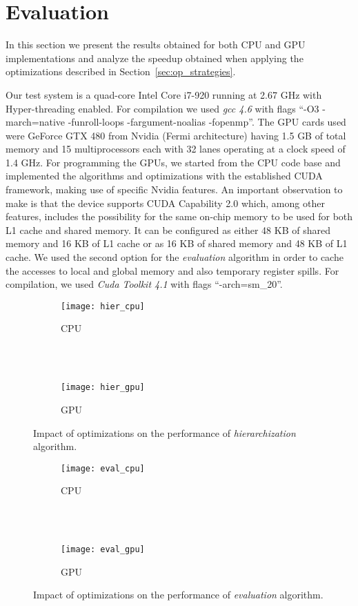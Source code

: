 \section{Evaluation}
\label{sec:evaluation}

In this section we present the results obtained for both CPU and GPU
implementations and analyze the speedup obtained when applying the
optimizations described in Section~\ref{sec:op_strategies}.

Our test system is a quad-core Intel Core i7-920 running at 2.67 GHz with
Hyper-threading enabled. For compilation we used \textit{gcc 4.6} with flags
``-O3 -march=native -funroll-loops -fargument-noalias -fopenmp''. The GPU cards
used were GeForce GTX 480 from Nvidia (Fermi architecture) having 1.5 GB of
total memory and 15 multiprocessors each with 32 lanes operating at a clock
speed of 1.4 GHz. For programming the GPUs, we started from the CPU code base
and implemented the algorithms and optimizations with the established CUDA
framework, making use of specific Nvidia features. An important observation to
make is that the device supports CUDA Capability 2.0 which, among other
features, includes the possibility for the same on-chip memory to be used for
both L1 cache and shared memory. It can be configured as either 48 KB of shared
memory and 16 KB of L1 cache or as 16 KB of shared memory and 48 KB of L1 cache.
We used the second option for the \textit{evaluation} algorithm in order to
cache the accesses to local and global memory and also temporary register
spills. For compilation, we used \textit{Cuda Toolkit 4.1} with flags
``-arch=sm\_20''.

\begin{figure}[t]
  \begin{subfigure}[b]{1\linewidth}
    \centering
    \texttt{[image: hier\_cpu]} \\
    \caption{CPU}
  \end{subfigure}
  \\ \\
  \begin{subfigure}[b]{1\linewidth}
    \centering
    \texttt{[image: hier\_gpu]}
    \caption{GPU}
  \end{subfigure}
  \caption{Impact of optimizations on the performance of \textit{hierarchization} algorithm.}
  \label{fig:hier_results}
\end{figure}

\begin{figure}[t]
  \begin{subfigure}[b]{1\linewidth}
    \centering
    \texttt{[image: eval\_cpu]} \\
    \caption{CPU}
  \end{subfigure}
  \\ \\
  \begin{subfigure}[b]{1\linewidth}
    \centering
    \texttt{[image: eval\_gpu]}
    \caption{GPU}
  \end{subfigure}
  \caption{Impact of optimizations on the performance of \textit{evaluation} algorithm.}
  \label{fig:eval_results}
\end{figure}

